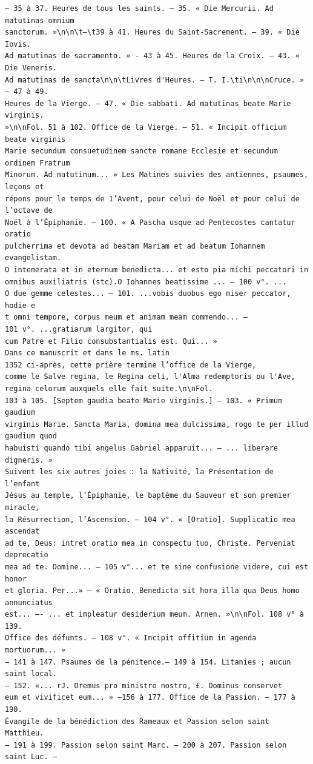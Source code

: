 \documentclass[a4paper,12pt,twoside]{book}
\begin{document}
\begin{verbatim}
— 35 à 37. Heures de tous les saints. — 35. « Die Mercurii. Ad matutinas omnium 
sanctorum. »\n\n\t—\t39 à 41. Heures du Saint-Sacrement. — 39. « Die Iovis. 
Ad matutinas de sacramento. » - 43 à 45. Heures de la Croix. — 43. « Die Veneris.
Ad matutinas de sancta\n\n\tLivres d'Heures. — T. I.\ti\n\n\nCruce. » — 47 à 49.
Heures de la Vierge. — 47. « Die sabbati. Ad matutinas beate Marie virginis. 
»\n\nFol. 51 à 102. Office de la Vierge. — 51. « Incipit officium beate virginis
Marie secundum consuetudinem sancte romane Ecclesie et secundum ordinem Fratrum 
Minorum. Ad matutinum... » Les Matines suivies des antiennes, psaumes, leçons et 
répons pour le temps de 1’Avent, pour celui de Noël et pour celui de l’octave de
Noël à l’Épiphanie. — 100. « A Pascha usque ad Pentecostes cantatur oratio 
pulcherrima et devota ad beatam Mariam et ad beatum Iohannem evangelistam. 
O intemerata et in eternum benedicta... et esto pia michi peccatori in 
omnibus auxiliatris (stc).O Iohannes beatissime ... — 100 v°. ...
O due gemme celestes... — 101. ...vobis duobus ego miser peccator, hodie e
t omni tempore, corpus meum et animam meam commendo... — 
101 v°. ...gratiarum largitor, qui
cum Patre et Filio consubstantialis est. Qui... »
Dans ce manuscrit et dans le ms. latin
1352 ci-après, cette prière termine l’office de la Vierge, 
comme le Salve regina, le Regina celi, l'Alma redemptoris ou l'Ave, 
regina celorum auxquels elle fait suite.\n\nFol.
103 à 105. [Septem gaudia beate Marie virginis.] — 103. « Primum gaudium 
virginis Marie. Sancta Maria, domina mea dulcissima, rogo te per illud 
gaudium quod 
habuisti quando tibi angelus Gabriel apparuit... — ... liberare digneris. »
Suivent les six autres joies : la Nativité, la Présentation de l’enfant 
Jésus au temple, l’Épiphanie, le baptême du Sauveur et son premier miracle, 
la Résurrection, l’Ascension. — 104 v°. « [Oratio]. Supplicatio mea ascendat 
ad te, Deus: intret oratio mea in conspectu tuo, Christe. Perveniat deprecatio 
mea ad te. Domine... — 105 v°... et te sine confusione videre, cui est honor 
et gloria. Per...» — « Oratio. Benedicta sit hora illa qua Deus homo annunciatus 
est... —- ... et impleatur desiderium meum. Arnen. »\n\nFol. 108 v° à 139.
Office des défunts. — 108 v°. « Incipit offitium in agenda mortuorum... » 
— 141 à 147. Psaumes de la pénitence.— 149 à 154. Litanies ; aucun saint local. 
— 152. «... rJ. Oremus pro ministro nostro, £. Dominus conservet 
eum et vivificet eum... » —156 à 177. Office de la Passion. — 177 à 190. 
Évangile de la bénédiction des Rameaux et Passion selon saint Matthieu. 
— 191 à 199. Passion selon saint Marc. — 200 à 207. Passion selon saint Luc. — 

\end{verbatim}
\end{document}
